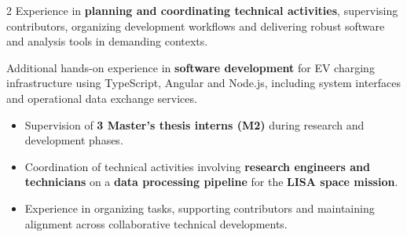\documentclass[8pt,a4paper,ragged2e,withhyper]{altacv}
\begin{document}
\begin{paracol}{2}
Experience in \textbf{planning and coordinating technical activities}, supervising contributors, organizing development workflows and delivering robust software and analysis tools in demanding contexts.

Additional hands-on experience in \textbf{software development} for EV charging infrastructure using TypeScript, Angular and Node.js, including system interfaces and operational data exchange services.


\begin{itemize}
  \item Supervision of \textbf{3 Master’s thesis interns (M2)} during research and development phases.
  \item Coordination of technical activities involving \textbf{research engineers and technicians} on a \textbf{data processing pipeline} for the \textbf{LISA space mission}.
  \item Experience in organizing tasks, supporting contributors and maintaining alignment across collaborative technical developments.
\end{itemize}

{}
\divider

\divider


\medskip

\divider



\divider
{}
\divider
{}




\end{paracol}
\end{document}
